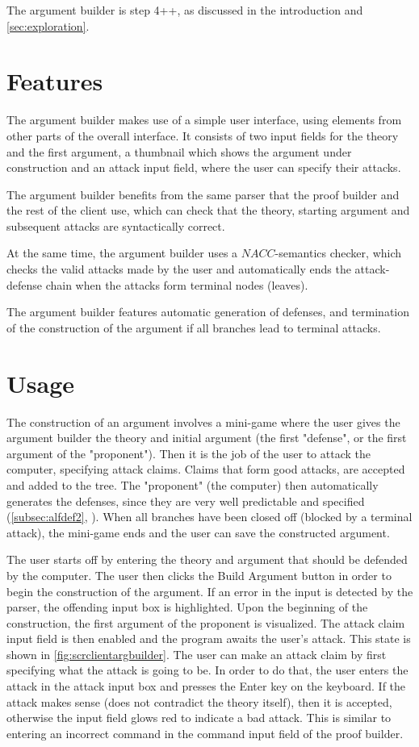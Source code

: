 \documentclass[11pt,twoside,a4paper]{report}
\begin{document}
The argument builder is step 4++, as discussed in the introduction and \autoref{sec:exploration}.

\section{Features}
The argument builder makes use of a simple user interface, using elements from other parts of the overall interface. It consists of two input fields for the theory and the first argument, a thumbnail which shows the argument under construction and an attack input field, where the user can specify their attacks.

The argument builder benefits from the same parser that the proof builder and the rest of the client use, which can check that the theory, starting argument and subsequent attacks are syntactically correct.

At the same time, the argument builder uses a $NACC$-semantics checker, which checks the valid attacks made by the user and automatically ends the attack-defense chain when the attacks form terminal nodes (leaves).

The argument builder features automatic generation of defenses, and termination of the construction of the argument if all branches lead to terminal attacks.

\section{Usage}
The construction of an argument involves a mini-game where the user gives the argument builder the theory and initial argument (the first "defense", or the first argument of the "proponent"). Then it is the job of the user to attack the computer, specifying attack claims. Claims that form good attacks, are accepted and added to the tree. The "proponent" (the computer) then automatically generates the defenses, since they are very well predictable and specified (\autoref{subsec:alfdef2}, ). When all branches have been closed off (blocked by a terminal attack), the mini-game ends and the user can save the constructed argument.

The user starts off by entering the theory and argument that should be defended by the computer. The user then clicks the Build Argument button in order to begin the construction of the argument. If an error in the input is detected by the parser, the offending input box is highlighted. Upon the beginning of the construction, the first argument of the proponent is visualized. The attack claim input field is then enabled and the program awaits the user's attack. This state is shown in \autoref{fig:scrclientargbuilder}. The user can make an attack claim by first specifying what the attack is going to be. In order to do that, the user enters the attack in the attack input box and presses the Enter key on the keyboard. If the attack makes sense (does not contradict the theory itself), then it is accepted, otherwise the input field glows red to indicate a bad attack. This is similar to entering an incorrect command in the command input field of the proof builder.
\end{document}
